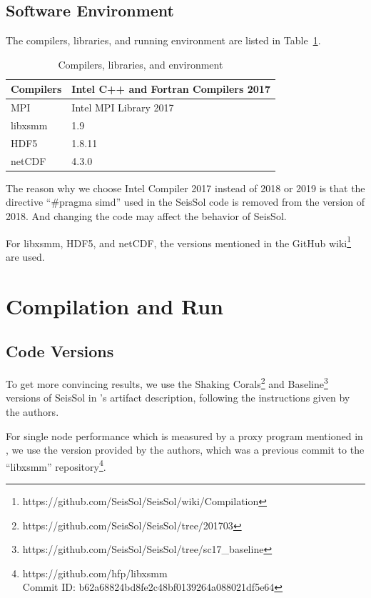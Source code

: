 \documentclass[5p,times]{sig-alternate-05-2015}
\begin{document}
\subsection{Software Environment}

The compilers, libraries, and running environment are listed in Table~\ref{tab:sw}.

\begin{table}[ht]
\centering

\begin{tabular}{|l|l|}
\hline
Compilers & Intel C++ and Fortran Compilers 2017 \\ \hline
MPI & Intel MPI Library 2017 \\ \hline
libxsmm & 1.9 \\ \hline
HDF5 & 1.8.11 \\ \hline
netCDF & 4.3.0 \\ \hline
\end{tabular}
\caption{Compilers, libraries, and environment}
\label{tab:sw}
\end{table}

The reason why we choose Intel Compiler 2017 instead of 2018 or 2019 is that the directive ``\#pragma simd'' used in the SeisSol code is removed from the version of 2018. And changing the code may affect the behavior of SeisSol.


For libxsmm, HDF5, and netCDF, the versions mentioned in the GitHub wiki\footnote{https://github.com/SeisSol/SeisSol/wiki/Compilation} are used.

\section{Compilation and Run}
\subsection{Code Versions}
To get more convincing results, we use the Shaking Corals\footnote{https://github.com/SeisSol/SeisSol/tree/201703} and Baseline\footnote{https://github.com/SeisSol/SeisSol/tree/sc17\_baseline} versions of SeisSol in \OriginalPaper{}'s artifact description, following the instructions given by the authors.

For single node performance which is measured by a proxy program mentioned in \OriginalPaper, we use the version provided by the authors, which was a previous commit to the ``libxsmm'' repository\footnote{https://github.com/hfp/libxsmm \\ Commit ID: b62a68824bd8fe2c48bf0139264a088021df5e64}.
\end{document}
